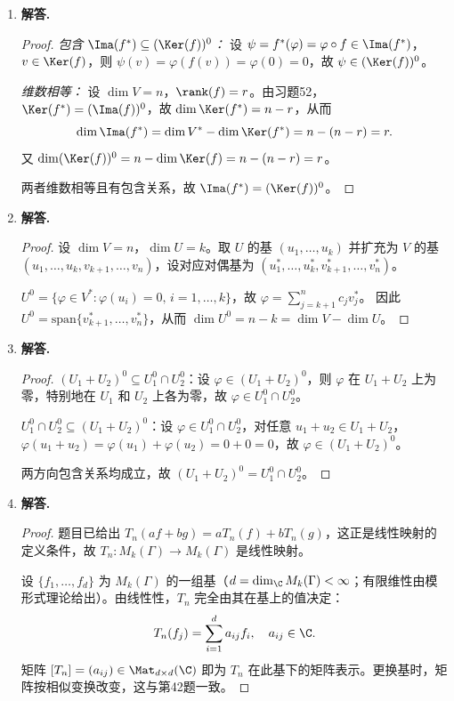 \begin{enumerate}[label=\textbf{\arabic*.}, leftmargin=*, itemsep=1em]
\begin{proof}
故 $\Ker(f^*)=(\Ima(f))^0$。
\end{proof}

\item \textbf{解答.}
\begin{proof}
\emph{包含 $\Ima(f^*)\subseteq(\Ker(f))^0$：} 设 $\psi=f^*(\varphi)=\varphi\circ f\in\Ima(f^*)$，$v\in\Ker(f)$，则 $\psi(v)=\varphi(f(v))=\varphi(0)=0$，故 $\psi\in(\Ker(f))^0$。

\emph{维数相等：} 设 $\dim V=n$，$\rank(f)=r$。由习题52，$\Ker(f^*)=(\Ima(f))^0$，故 $\dim\Ker(f^*)=n-r$，从而
\[
  \dim\Ima(f^*)=\dim V^*-\dim\Ker(f^*)=n-(n-r)=r.
\]
又 $\dim(\Ker(f))^0=n-\dim\Ker(f)=n-(n-r)=r$。

两者维数相等且有包含关系，故 $\Ima(f^*)=(\Ker(f))^0$。
\end{proof}

\item \textbf{解答.}
\begin{proof}
设 $\dim V=n$，$\dim U=k$。取 $U$ 的基 $(u_1,\ldots,u_k)$ 并扩充为 $V$ 的基 $(u_1,\ldots,u_k,v_{k+1},\ldots,v_n)$，设对应对偶基为 $(u_1^*,\ldots,u_k^*,v_{k+1}^*,\ldots,v_n^*)$。

$U^0=\{\varphi\in V^*:\varphi(u_i)=0,\,i=1,\ldots,k\}$，故 $\varphi=\sum_{j=k+1}^n c_j v_j^*$。
因此 $U^0=\mathrm{span}\{v_{k+1}^*,\ldots,v_n^*\}$，从而 $\dim U^0=n-k=\dim V-\dim U$。
\end{proof}

\item \textbf{解答.}
\begin{proof}
$(U_1+U_2)^0\subseteq U_1^0\cap U_2^0$：设 $\varphi\in(U_1+U_2)^0$，则 $\varphi$ 在 $U_1+U_2$ 上为零，特别地在 $U_1$ 和 $U_2$ 上各为零，故 $\varphi\in U_1^0\cap U_2^0$。

$U_1^0\cap U_2^0\subseteq(U_1+U_2)^0$：设 $\varphi\in U_1^0\cap U_2^0$，对任意 $u_1+u_2\in U_1+U_2$，$\varphi(u_1+u_2)=\varphi(u_1)+\varphi(u_2)=0+0=0$，故 $\varphi\in(U_1+U_2)^0$。

两方向包含关系均成立，故 $(U_1+U_2)^0=U_1^0\cap U_2^0$。
\end{proof}


\item \textbf{解答.}
\begin{proof}
题目已给出 $T_n(af+bg)=aT_n(f)+bT_n(g)$，这正是线性映射的定义条件，故 $T_n\colon M_k(\Gamma)\to M_k(\Gamma)$ 是线性映射。

设 $\{f_1,\ldots,f_d\}$ 为 $M_k(\Gamma)$ 的一组基（$d=\dim_\C M_k(\Gamma)<\infty$；有限维性由模形式理论给出）。由线性性，$T_n$ 完全由其在基上的值决定：
\[
  T_n(f_j)=\sum_{i=1}^d a_{ij}f_i,\quad a_{ij}\in\C.
\]
矩阵 $[T_n]=(a_{ij})\in\Mat_{d\times d}(\C)$ 即为 $T_n$ 在此基下的矩阵表示。更换基时，矩阵按相似变换改变，这与第42题一致。
\end{proof}


\end{enumerate}
